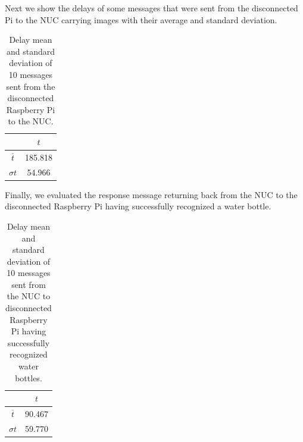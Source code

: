 Next we show the delays of some messages that were sent from the disconnected Pi to the NUC carrying images with their average and standard deviation.
\begin{table}[H]
	\centering
\begin{tabular}{c|c}\toprule
		  & $t$  \\ \midrule
$ \overline{t} $&	185.818\\
$ \sigma t $&	54.966\\
\end{tabular}
	\caption{Delay mean and standard deviation of 10 messages sent from the disconnected Raspberry Pi to the NUC.}
	\label{table:DIS2}
\end{table}

\noindent Finally, we evaluated the response message returning back from the NUC to the disconnected Raspberry Pi having successfully recognized a water bottle.

\begin{table}[H]
	\centering
	\begin{tabular}{c|c}\toprule
		& $t$  \\ \midrule
$ \overline{t} $& 	90.467\\
$ \sigma t $&	59.770\\
	\end{tabular}
	\caption{Delay mean and standard deviation of 10 messages sent from the NUC to disconnected Raspberry Pi having successfully recognized water bottles.}
	\label{table:DIS3}
\end{table}


